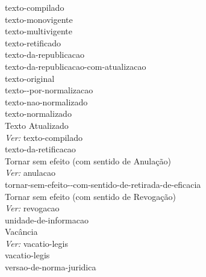  \hspace*{3.0cm}\glosshsep \Gls{texto-compilado} \\ 
 \hspace*{4.0cm}\glosshsep \Gls{texto-monovigente} \\ 
 \hspace*{4.0cm}\glosshsep \Gls{texto-multivigente} \\ 
 \hspace*{4.0cm}\glosshsep \Gls{texto-retificado} \\ 
 \hspace*{3.0cm}\glosshsep \Gls{texto-da-republicacao} \\ 
 \hspace*{3.0cm}\glosshsep \Gls{texto-da-republicacao-com-atualizacao} \\ 
 \hspace*{2.0cm}\glosshsep \Gls{texto-original} \\ 
 \hspace*{1.0cm}\glosshsepclass \Gls{texto--por-normalizacao} \\ 
 \hspace*{2.0cm}\glosshsep \Gls{texto-nao-normalizado} \\ 
 \hspace*{2.0cm}\glosshsep \Gls{texto-normalizado} \\ 
Texto Atualizado \\ 
 \hspace*{1.0cm}\glosshsep \textit{Ver:} \Gls{texto-compilado} \\ 
\Gls{texto-da-retificacao} \\ 
Tornar sem efeito (com sentido de Anulação) \\ 
 \hspace*{1.0cm}\glosshsep \textit{Ver:} \Gls{anulacao} \\ 
\Gls{tornar-sem-efeito--com-sentido-de-retirada-de-eficacia} \\ 
Tornar sem efeito (com sentido de Revogação) \\ 
 \hspace*{1.0cm}\glosshsep \textit{Ver:} \Gls{revogacao} \\ 
\Gls{unidade-de-informacao} \\ 
Vacância \\ 
 \hspace*{1.0cm}\glosshsep \textit{Ver:} \Gls{vacatio-legis} \\ 
\Gls{vacatio-legis} \\ 
\Gls{versao-de-norma-juridica} \\ 
